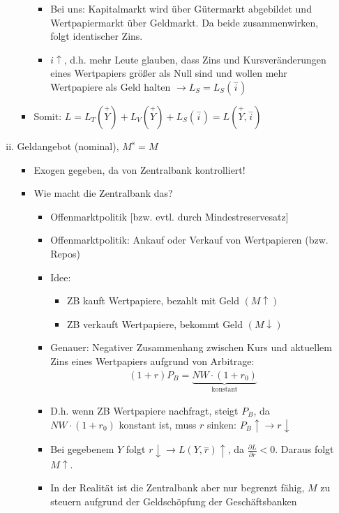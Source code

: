 \documentclass{scrartcl}
\begin{document}
\begin{enumerate}[(a)]
\begin{enumerate}[(i)]
\begin{itemize}
\begin{itemize}
          \item Bei uns: Kapitalmarkt wird \"{u}ber G\"{u}termarkt abgebildet und Wertpapiermarkt \"{u}ber Geldmarkt. Da beide zusammenwirken, folgt identischer Zins.
          \item $i\uparrow$, d.h. mehr Leute glauben, dass Zins und Kursver\"{a}nderungen eines Wertpapiers gr\"{o}{\ss}er als Null sind und wollen mehr Wertpapiere als Geld halten $\rightarrow L_S=L_S(\overset{-}{i})$
        \end{itemize}
        \item Somit: $L = L_T(\overset{+}{Y})+L_V(\overset{+}{Y})+L_S(\overset{-}{i}) = L(\overset{+}{Y},\overset{-}{i})$
    \end{itemize}

    \item Geldangebot (nominal), $M^s=M$
    \begin{itemize}
      \item Exogen gegeben, da von Zentralbank kontrolliert!
      \item Wie macht die Zentralbank das?
      \begin{itemize}
      \item Offenmarktpolitik [bzw. evtl. durch Mindestreservesatz]
      \item Offenmarktpolitik: Ankauf oder Verkauf von Wertpapieren (bzw. Repos)
      \item Idee:
      \begin{itemize}
        \item ZB kauft Wertpapiere, bezahlt mit Geld $(M\uparrow)$
        \item ZB verkauft Wertpapiere, bekommt Geld $(M\downarrow)$
      \end{itemize}
      \item Genauer: Negativer Zusammenhang zwischen Kurs und aktuellem Zins eines Wertpapiers aufgrund von Arbitrage:
      \begin{align*}
        (1+r)P_B = \underbrace{NW\cdot(1+r_0)}_\text{konstant}
      \end{align*}
      \item D.h. wenn ZB Wertpapiere nachfragt, steigt $P_B$, da $NW\cdot(1+r_0)$ konstant ist, muss $r$ sinken: $P_B\uparrow \rightarrow r \downarrow$
      \item Bei gegebenem $Y$ folgt $r\downarrow \rightarrow L(Y,\overset{-}{r})\uparrow$, da $\frac{\partial L}{\partial r}<0$. Daraus folgt $M\uparrow$.
      \item In der Realit\"{a}t ist die Zentralbank aber nur begrenzt f\"{a}hig, $M$ zu steuern aufgrund der Geldsch\"{o}pfung der Gesch\"{a}ftsbanken

\end{itemize}
\end{itemize}
\end{enumerate}
\end{enumerate}
\end{document}
